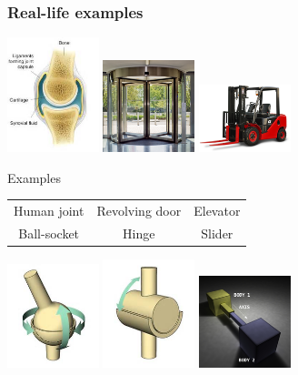 \documentclass{beamer}
\begin{document}
\begin{frame}
\frametitle {Real-life examples}
\begin{center}
\includegraphics[width = 0.2\textwidth]{humanjoint.png}
\includegraphics[width = 0.2\textwidth]{door.png}
\includegraphics[width = 0.2\textwidth]{elevator.png}
   \begin{exampleblock}{Examples}
    \begin{center}
     \begin{tabular}{c c c}
       Human joint & Revolving door & Elevator \\
       Ball-socket & Hinge & Slider
     \end{tabular}
     \end{center}
   \end{exampleblock}
   \includegraphics[width = 0.2\textwidth]{ballsock.png}
   \includegraphics[width = 0.2\textwidth]{hinge.png}
   \includegraphics[width = 0.2\textwidth]{slider.png}
\end{center}
\end{frame}
\end{document}
